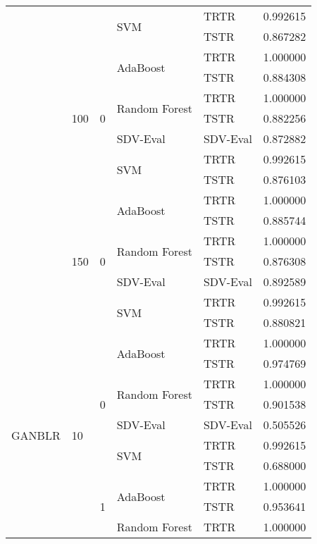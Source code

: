 \begin{longtable}{lllllr}
\cline{4-6}
 &  &  & \multirow[t]{2}{*}{SVM} & TRTR & 0.992615 \\
 &  &  &  & TSTR & 0.867282 \\
\cline{2-6} \cline{3-6} \cline{4-6}
 & \multirow[t]{7}{*}{100} & \multirow[t]{7}{*}{0} & \multirow[t]{2}{*}{AdaBoost} & TRTR & 1.000000 \\
 &  &  &  & TSTR & 0.884308 \\
\cline{4-6}
 &  &  & \multirow[t]{2}{*}{Random Forest} & TRTR & 1.000000 \\
 &  &  &  & TSTR & 0.882256 \\
\cline{4-6}
 &  &  & SDV-Eval & SDV-Eval & 0.872882 \\
\cline{4-6}
 &  &  & \multirow[t]{2}{*}{SVM} & TRTR & 0.992615 \\
 &  &  &  & TSTR & 0.876103 \\
\cline{2-6} \cline{3-6} \cline{4-6}
 & \multirow[t]{7}{*}{150} & \multirow[t]{7}{*}{0} & \multirow[t]{2}{*}{AdaBoost} & TRTR & 1.000000 \\
 &  &  &  & TSTR & 0.885744 \\
\cline{4-6}
 &  &  & \multirow[t]{2}{*}{Random Forest} & TRTR & 1.000000 \\
 &  &  &  & TSTR & 0.876308 \\
\cline{4-6}
 &  &  & SDV-Eval & SDV-Eval & 0.892589 \\
\cline{4-6}
 &  &  & \multirow[t]{2}{*}{SVM} & TRTR & 0.992615 \\
 &  &  &  & TSTR & 0.880821 \\
\cline{1-6} \cline{2-6} \cline{3-6} \cline{4-6}
\multirow[t]{70}{*}{GANBLR} & \multirow[t]{14}{*}{10} & \multirow[t]{7}{*}{0} & \multirow[t]{2}{*}{AdaBoost} & TRTR & 1.000000 \\
 &  &  &  & TSTR & 0.974769 \\
\cline{4-6}
 &  &  & \multirow[t]{2}{*}{Random Forest} & TRTR & 1.000000 \\
 &  &  &  & TSTR & 0.901538 \\
\cline{4-6}
 &  &  & SDV-Eval & SDV-Eval & 0.505526 \\
\cline{4-6}
 &  &  & \multirow[t]{2}{*}{SVM} & TRTR & 0.992615 \\
 &  &  &  & TSTR & 0.688000 \\
\cline{3-6} \cline{4-6}
 &  & \multirow[t]{7}{*}{1} & \multirow[t]{2}{*}{AdaBoost} & TRTR & 1.000000 \\
 &  &  &  & TSTR & 0.953641 \\
\cline{4-6}
 &  &  & \multirow[t]{2}{*}{Random Forest} & TRTR & 1.000000 \\

\end{longtable}
